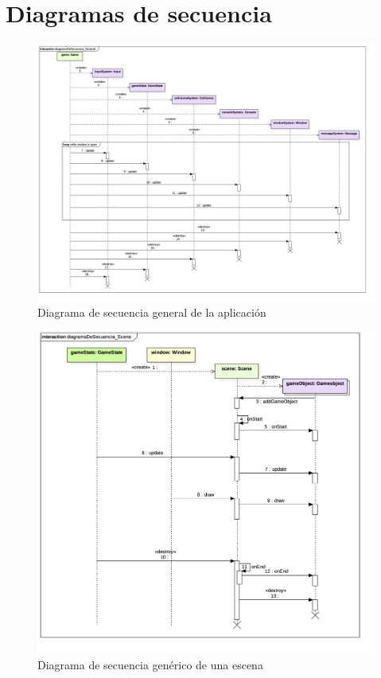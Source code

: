 \section{Diagramas de secuencia}

\begin{figure}
	\centerline{\includegraphics[width=19cm]{otros/UML/png/alld/png/CasosDeUso__General__Collaboration1__Interaction1__diagramaDeSecuencia_General_15.png}}
	\caption{Diagrama de secuencia general de la aplicación}
	\label{sec:general}
\end{figure}

\begin{figure}
	\centerline{\includegraphics[width=15cm]{otros/UML/png/alld/png/CasosDeUso__General__Collaboration2__Interaction1__diagramaDeSecuencia_Scene_16.png}}
	\caption{Diagrama de secuencia genérico de una escena}
	\label{sec:scene}
\end{figure}

